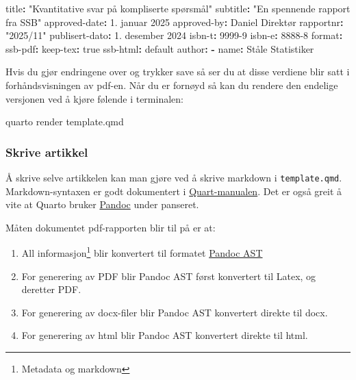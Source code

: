 \documentclass[
  10pt,
]{scrartcl}
\newenvironment{Shaded}{\begin{snugshade}}{\end{snugshade}}
\newcommand{\AttributeTok}[1]{\textcolor[rgb]{0.40,0.45,0.13}{#1}}
\newcommand{\CharTok}[1]{\textcolor[rgb]{0.13,0.47,0.30}{#1}}
\newcommand{\ExtensionTok}[1]{\textcolor[rgb]{0.00,0.23,0.31}{#1}}
\newcommand{\FunctionTok}[1]{\textcolor[rgb]{0.28,0.35,0.67}{#1}}
\newcommand{\KeywordTok}[1]{\textcolor[rgb]{0.00,0.23,0.31}{\textbf{#1}}}
\newcommand{\NormalTok}[1]{\textcolor[rgb]{0.00,0.23,0.31}{#1}}
\newcommand{\StringTok}[1]{\textcolor[rgb]{0.13,0.47,0.30}{#1}}
\providecommand{\tightlist}{%
  \setlength{\itemsep}{0pt}\setlength{\parskip}{0pt}}\usepackage{longtable,booktabs,array}
\begin{document}
\begin{Shaded}
\begin{Highlighting}[]
\FunctionTok{title}\KeywordTok{:}\AttributeTok{ }\StringTok{"Kvantitative svar på kompliserte spørsmål"}
\FunctionTok{subtitle}\KeywordTok{:}\AttributeTok{ }\StringTok{"En spennende rapport fra SSB"}
\FunctionTok{approved{-}date}\KeywordTok{:}\AttributeTok{ 1. januar 2025}
\FunctionTok{approved{-}by}\KeywordTok{:}\AttributeTok{ Daniel Direktør}
\FunctionTok{rapportnr}\KeywordTok{:}\AttributeTok{ }\StringTok{"2025/11"}
\FunctionTok{publisert{-}dato}\KeywordTok{:}\AttributeTok{ 1. desember 2024}
\FunctionTok{isbn{-}t}\KeywordTok{:}\AttributeTok{ 9999{-}9}
\FunctionTok{isbn{-}e}\KeywordTok{:}\AttributeTok{ 8888{-}8}
\FunctionTok{format}\KeywordTok{:}
\AttributeTok{  }\FunctionTok{ssb{-}pdf}\KeywordTok{:}
\AttributeTok{    }\FunctionTok{keep{-}tex}\KeywordTok{:}\AttributeTok{ }\CharTok{true}\AttributeTok{  }
\AttributeTok{  }\FunctionTok{ssb{-}html}\KeywordTok{:}\AttributeTok{ default}
\FunctionTok{author}\KeywordTok{:}
\AttributeTok{  }\KeywordTok{{-}}\AttributeTok{ }\FunctionTok{name}\KeywordTok{:}\AttributeTok{ Ståle Statistiker}
\end{Highlighting}
\end{Shaded}

Hvis du gjør endringene over og trykker save så ser du at disse verdiene
blir satt i forhåndsvisningen av pdf-en. Når du er fornøyd så kan du
rendere den endelige versjonen ved å kjøre følende i terminalen:

\begin{Shaded}
\begin{Highlighting}[]
\ExtensionTok{quarto}\NormalTok{ render template.qmd}
\end{Highlighting}
\end{Shaded}

\subsubsection{Skrive artikkel}\label{skrive-artikkel}

Å skrive selve artikkelen kan man gjøre ved å skrive markdown i
\texttt{template.qmd}. Markdown-syntaxen er godt dokumentert i
\href{https://quarto.org/docs/authoring/markdown-basics.html}{Quart-manualen}.
Det er også greit å vite at Quarto bruker
\href{https://pandoc.org/}{Pandoc} under panseret.

Måten dokumentet pdf-rapporten blir til på er at:

\begin{enumerate}
\def\labelenumi{\arabic{enumi}.}
\tightlist
\item
  All informasjon\footnote{Metadata og markdown} blir konvertert til
  formatet \href{https://pandoc.org/lua-filters.html}{Pandoc AST}
\item
  For generering av PDF blir Pandoc AST først konvertert til Latex, og
  deretter PDF.
\item
  For generering av docx-filer blir Pandoc AST konvertert direkte til
  docx.
\item
  For generering av html blir Pandoc AST konvertert direkte til html.
\end{enumerate}
\end{document}
